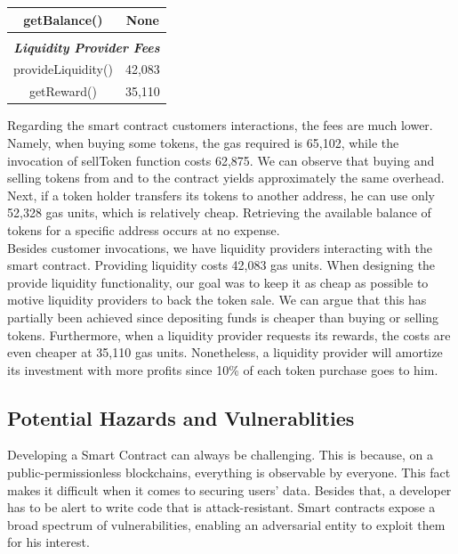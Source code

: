 \documentclass[12pt,a4paper]{article}
\begin{document}
\begin{table}[htpb]
\begin{center}
\begin{tabular}{cc}
        \multicolumn{1}{|c|}{getBalance()}                                 & \multicolumn{1}{c|}{None}   \\ \hline
        \multicolumn{1}{l}{}                                               & \multicolumn{1}{l}{}             \\ \hline
        \multicolumn{2}{|c|}{\textit{\textbf{Liquidity Provider Fees}}}                                       \\ \hline   
        \multicolumn{1}{|c|}{provideLiquidity()}                           & \multicolumn{1}{c|}{42,083}   \\ \hline
        \multicolumn{1}{|c|}{getReward()}                                  & \multicolumn{1}{c|}{35,110}   \\ \hline
        \end{tabular}
    \end{center}
\end{table}

Regarding the smart contract customers interactions, the fees are much lower.
Namely, when buying some tokens, the gas required is 65,102, while the
invocation of sellToken function costs 62,875. We can observe that buying and
selling tokens from and to the contract yields approximately the same overhead.
Next, if a token holder transfers its tokens to another address, he can use only
52,328 gas units, which is relatively cheap. Retrieving the available balance of
tokens for a specific address occurs at no expense. \\

Besides customer invocations, we have liquidity providers interacting with the
smart contract. Providing liquidity costs 42,083 gas units. When designing the
provide liquidity functionality, our goal was to keep it as cheap as possible to
motive liquidity providers to back the token sale. We can argue that this has
partially been achieved since depositing funds is cheaper than buying or selling
tokens. Furthermore, when a liquidity provider requests its rewards, the costs
are even cheaper at 35,110 gas units. Nonetheless, a liquidity provider will
amortize its investment with more profits since 10\% of each token purchase goes
to him.

\pagebreak

\subsection*{Potential Hazards and Vulnerablities}

Developing a Smart Contract can always be challenging. This is because, on a
public-permissionless blockchains, everything is observable by everyone. This
fact makes it difficult when it comes to securing users’ data. Besides that, a
developer has to be alert to write code that is attack-resistant. Smart
contracts expose a broad spectrum of vulnerabilities, enabling an adversarial
entity to exploit them for his interest.\\
\end{document}
